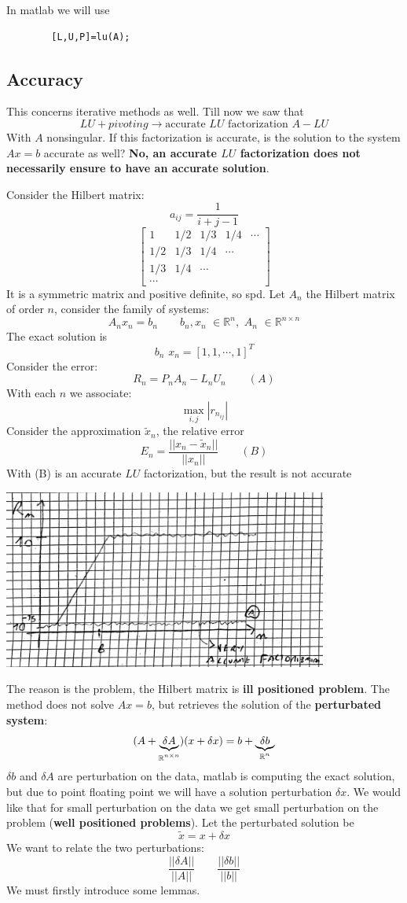     In matlab we will use
    \begin{lstlisting}
        [L,U,P]=lu(A);
    \end{lstlisting}

\subsection{Accuracy}
This concerns iterative methods as well. Till now we saw that
$$
LU+pivoting\rightarrow \text{accurate $LU$ factorization $A-LU$}
$$
With $A$ nonsingular. If this factorization is accurate, is the solution to the system $Ax=b$ accurate as well? \textbf{No, an accurate $LU$ factorization does not necessarily ensure to have an accurate solution}.

Consider the Hilbert matrix:
$$
a_{ij}=\frac{1}{i+j-1}
$$
$$
\begin{bmatrix}
    1 & 1/2 & 1/3 & 1/4 & \cdots\\
    1/2 & 1/3 & 1/4 & \cdots\\
    1/3 & 1/4 & \cdots\\
    \cdots
\end{bmatrix}
$$
It is a symmetric matrix and positive definite, so spd. Let $A_n$ the Hilbert matrix of order $n$, consider the family of systems:
$$
A_nx_n=b_n\qquad b_n,x_n\,\,\in\mathbb{R}^n,\,\,A_n\,\,\in\mathbb{R}^{n\times n}
$$
The exact solution is
$$
b_n\,\,x_n=[1,1,\cdots,1]^T
$$
Consider the error:
$$
R_n=P_nA_n-L_nU_n\qquad(A)
$$
With each $n$ we associate:
$$
\max_{i,j}\left|r_{n_{ij}}\right|
$$
Consider the approximation $\tilde{x}_n$, the relative error
$$
E_n=\frac{||x_n-\tilde{x}_n||}{||x_n||}\qquad(B)
$$
With (B) is an accurate $LU$ factorization, but the result is not accurate
\begin{center}
    \includegraphics[width=0.8\textwidth]{images/accLU.png}
\end{center}
The reason is the problem, the Hilbert matrix is \textbf{ill positioned problem}. The method does not solve $Ax=b$, but retrieves the solution of the \textbf{perturbated system}:
$$
(A+\underlabel{\delta A}{$\mathbb{R}^{n\times n}$})(x+\delta x)=b+\underlabel{\delta b}{$\mathbb{R}^n$}
$$
$\delta b$ and $\delta A$ are perturbation on the data, matlab is computing the exact solution, but due to point floating point we will have a solution perturbation $\delta x$. We would like that for small perturbation on the data we get small perturbation on the problem (\textbf{well positioned problems}). Let the perturbated solution be
$$
\tilde{x}=x+\delta x
$$
We want to relate the two perturbations:
$$\frac{||\delta A||}{||A||}\qquad\frac{||\delta b||}{||b||}$$
We must firstly introduce some lemmas.

